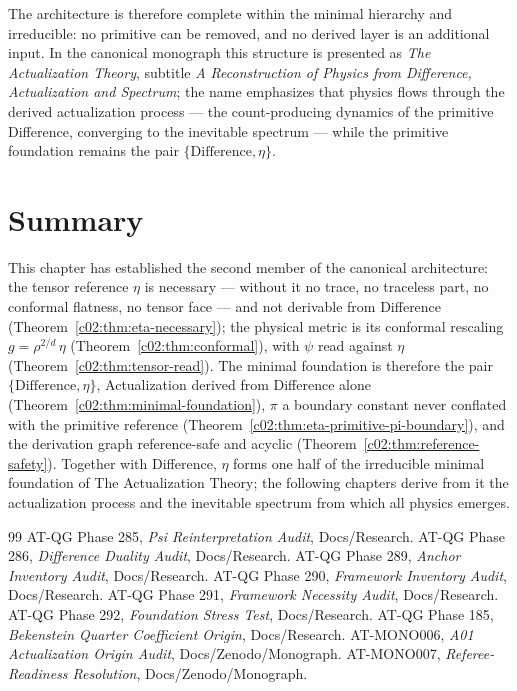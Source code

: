 The architecture is therefore complete within the minimal hierarchy and irreducible: no
primitive can be removed, and no derived layer is an additional input. In the canonical
monograph this structure is presented as \emph{The Actualization Theory}, subtitle
\emph{A Reconstruction of Physics from Difference, Actualization and Spectrum}; the name
emphasizes that physics flows through the derived actualization process --- the
count-producing dynamics of the primitive Difference, converging to the inevitable spectrum
--- while the primitive foundation remains the pair $\{\text{Difference},\eta\}$.

\section{Summary}
\label{c02:sec:eta-summary}

This chapter has established the second member of the canonical architecture: the tensor
reference $\eta$ is necessary --- without it no trace, no traceless part, no conformal
flatness, no tensor face --- and not derivable from Difference (Theorem~\ref{c02:thm:eta-necessary});
the physical metric is its conformal rescaling $g=\rho^{2/d}\,\eta$
(Theorem~\ref{c02:thm:conformal}), with $\psi$ read against $\eta$
(Theorem~\ref{c02:thm:tensor-read}). The minimal foundation is therefore the pair
$\{\text{Difference},\eta\}$, Actualization derived from Difference alone
(Theorem~\ref{c02:thm:minimal-foundation}), $\pi$ a boundary constant never conflated with
the primitive reference (Theorem~\ref{c02:thm:eta-primitive-pi-boundary}), and the derivation
graph reference-safe and acyclic (Theorem~\ref{c02:thm:reference-safety}). Together with
Difference, $\eta$ forms one half of the irreducible minimal foundation of The Actualization
Theory; the following chapters derive from it the actualization process and the inevitable
spectrum from which all physics emerges.

\begin{thebibliography}{99}
 AT-QG Phase 285, \emph{Psi Reinterpretation Audit}, Docs/Research.
 AT-QG Phase 286, \emph{Difference Duality Audit}, Docs/Research.
 AT-QG Phase 289, \emph{Anchor Inventory Audit}, Docs/Research.
 AT-QG Phase 290, \emph{Framework Inventory Audit}, Docs/Research.
 AT-QG Phase 291, \emph{Framework Necessity Audit}, Docs/Research.
 AT-QG Phase 292, \emph{Foundation Stress Test}, Docs/Research.
 AT-QG Phase 185, \emph{Bekenstein Quarter Coefficient Origin}, Docs/Research.
 AT-MONO006, \emph{A01 Actualization Origin Audit}, Docs/Zenodo/Monograph.
 AT-MONO007, \emph{Referee-Readiness Resolution}, Docs/Zenodo/Monograph.
\end{thebibliography}
